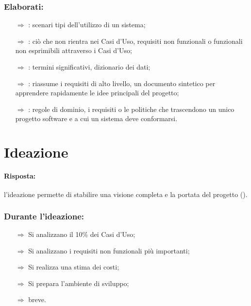 \subsubsection{Elaborati:}

\begin{itemize}
    \item [$\Rightarrow$] : scenari tipi dell'utilizzo di un sistema;
    \item [$\Rightarrow$] : ciò che non rientra nei Casi d'Uso, requisiti non funzionali o funzionali non esprimibili attraverso i Casi d'Uso;
    \item [$\Rightarrow$] : termini significativi, dizionario dei dati;
    \item [$\Rightarrow$] : riassume i requisiti di alto livello, un documento sintetico per apprendere rapidamente le idee principali del progetto;
    \item [$\Rightarrow$] : regole di dominio, i requisiti o le politiche che trascendono un unico progetto software e a cui un sistema deve conformarsi.
\end{itemize}

\section{Ideazione}


\paragraph{Risposta:} l'ideazione permette di stabilire una visione completa
e la portata del progetto ().

\subsubsection{Durante l'ideazione:}

\begin{itemize}
    \item [$\Rightarrow$] Si analizzano il 10\% dei Casi d'Uso;
    \item [$\Rightarrow$] Si analizzano i requisiti non funzionali più importanti;
    \item [$\Rightarrow$] Si realizza una stima dei costi;
    \item [$\Rightarrow$] Si prepara l'ambiente di sviluppo;
    \item [$\Rightarrow$]  breve.
\end{itemize}

